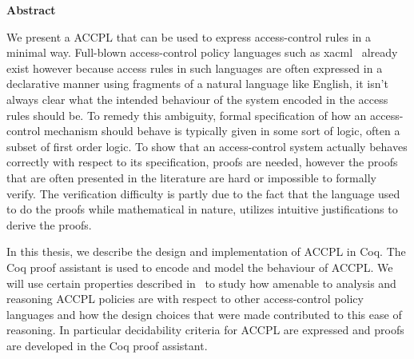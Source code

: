 
\begin{center}\textbf{Abstract}\end{center}

We present a \ac{ACCPL} that can be used to express access-control rules in a minimal way. Full-blown access-control policy languages such as \ac{xacml}~\cite{xacml} already exist however because access rules in such languages are often expressed in a declarative manner using fragments of a natural language like English, it isn't always clear what the intended behaviour of the system encoded in the access rules should be. To remedy this ambiguity, formal specification of how an access-control mechanism should behave is typically given in some sort of logic, often a subset of first order logic. To show that an access-control system actually behaves correctly with respect to its specification, proofs are needed, however the proofs that are often presented in the literature are hard or impossible to formally verify. The verification difficulty is partly due to the fact that the language used to do the proofs while mathematical in nature, utilizes intuitive justifications to derive the proofs. 

In this thesis, we describe the design and implementation of \ac{ACCPL} in Coq. The Coq proof assistant is used to encode and model the behaviour of \ac{ACCPL}. We will use certain properties described in~\cite{Tschantz} to study how amenable to analysis and reasoning \ac{ACCPL} policies are with respect to other access-control policy languages and how the design choices that were made contributed to this ease of reasoning. In particular decidability criteria for \ac{ACCPL} are expressed and proofs are developed in the Coq proof assistant.

\cleardoublepage

